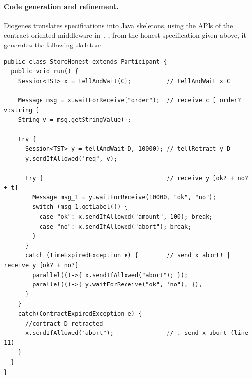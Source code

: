 \paragraph{Code generation and refinement.}
Diogenes translates \coco specifications into Java skeletons,
using the APIs of the contract-oriented middleware in~\cite{CO2middleware}.
, from the honest specification given above,
it generates the following skeleton:
\begin{mdframed}
  \begin{verbatim}
public class StoreHonest extends Participant { 
  public void run() {
    Session<TST> x = tellAndWait(C);          // tellAndWait x C
    
    Message msg = x.waitForReceive("order");  // receive c [ order? v:string ]
    String v = msg.getStringValue();
    
    try {
      Session<TST> y = tellAndWait(D, 10000); // tellRetract y D
      y.sendIfAllowed("req", v);
      
      try {                                   // receive y [ok? + no? + t]
        Message msg_1 = y.waitForReceive(10000, "ok", "no");
        switch (msg_1.getLabel()) {                    
          case "ok": x.sendIfAllowed("amount", 100); break;
          case "no": x.sendIfAllowed("abort"); break;                    
        }
      }
      catch (TimeExpiredException e) {        // send x abort! | receive y [ok? + no?] 
        parallel(()->{ x.sendIfAllowed("abort"); });
        parallel(()->{ y.waitForReceive("ok", "no"); });
      }            
    }
    catch(ContractExpiredException e) {
      //contract D retracted
      x.sendIfAllowed("abort");               // : send x abort (line 11)
    } 
  }
}
  \end{verbatim}
\end{mdframed}

